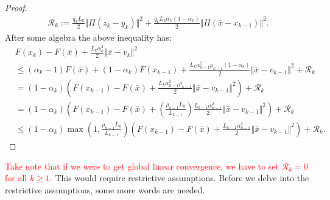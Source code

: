 \documentclass[12pt]{article}
\begin{document}
\begin{proof}
\begin{align*}
                \mathcal R_k := \frac{q_kL_k}{2}\Vert \Pi(z_k - y_k)\Vert^2 
                + \frac{q_kL_k\alpha_k(1 - \alpha_k)}{2}\Vert \Pi(\bar x - x_{k - 1})\Vert^2. 
            \end{align*}
            After some algebra the above inequality has: 
            \begin{align*}
                & 
                F(x_k) - F(\bar x) 
                + \frac{L_k\alpha_k^2}{2}\Vert \bar x - v_k\Vert^2
                \\
                &\le 
                (\alpha_k - 1)F(\bar x) + (1 - \alpha_k)F(x_{k - 1}) 
                + \frac{L_k\alpha_{k - 1}^2\rho_{k - 1}(1 - \alpha_k)}{2}\Vert \bar x - v_{k - 1}\Vert^2
                + \mathcal R_k
                \\
                &= (1 - \alpha_k)\left(
                    F(x_{k - 1}) - F(\bar x) 
                    + \frac{L_k\alpha_{k - 1}^2\rho_{k - 1}}{2}\Vert \bar x - v_{k - 1}\Vert^2
                \right) + \mathcal R_k
                \\ 
                &= (1 - \alpha_k)\left(
                    F(x_{k - 1}) - F(\bar x) 
                    + \left(
                        \frac{\rho_{k - 1}L_k}{L_{k - 1}}
                    \right)\frac{L_{k - 1}\alpha_{k - 1}^2}{2}\Vert \bar x - v_{k - 1}\Vert^2
                \right) + \mathcal R_k
                \\
                &\le 
                (1 - \alpha_k)\max\left(
                    1, \frac{\rho_{k - 1}L_k}{L_{k - 1}}
                \right)\left(
                    F(x_{k - 1}) - F(\bar x) 
                    + \frac{L_{k - 1}\alpha_{k - 1}^2}{2}\Vert \bar x - v_{k - 1}\Vert^2
                \right) + \mathcal R_k. 
            \end{align*}
        \end{proof}
        \par
        \textcolor{red}{Take note that if we were to get global linear convergence, we have to set $\mathcal R_k = 0$ for all $k \ge 1$.}
        This would require restrictive assumptions. 
        Before we delve into the restrictive assumptions, some more words are needed. 
\end{document}
